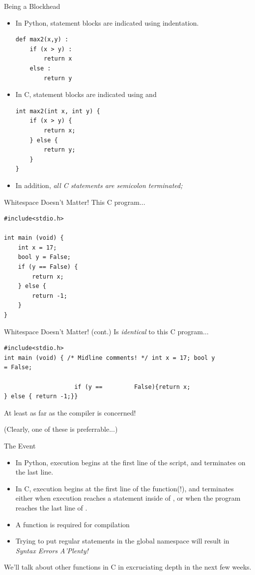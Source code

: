 \documentclass[11pt]{beamer}
\let\OldTexttt\texttt
\renewcommand{\texttt}[1]{\OldTexttt{\color{teal}{#1}}}
\begin{document}
\begin{frame}[fragile=singleslide]{Being a Blockhead}
\begin{itemize}
\item In Python, statement blocks are indicated using indentation.
\begin{lstlisting}[style=Python]
def max2(x,y) :
	if (x > y) :
		return x
	else :
		return y
\end{lstlisting}
\item In C, statement blocks are indicated using \texttt{$\{$} and \texttt{$\}$}
\begin{lstlisting}[style=C]
int max2(int x, int y) {
	if (x > y) {
		return x;
	} else {
		return y;
	}
}
\end{lstlisting}
\item In addition, \emph{all C statements are semicolon terminated;}
\end{itemize}
\end{frame}

\begin{frame}[fragile=singleslide]{Whitespace Doesn't Matter!}
This C program...
\begin{lstlisting}[style=C]
#include<stdio.h>

int main (void) { 
	int x = 17;
	bool y = False;
	if (y == False) {
		return x;
	} else {
		return -1;
	}
}
\end{lstlisting}
\end{frame}
\begin{frame}[fragile=singleslide]{Whitespace Doesn't Matter! (cont.)}
Is \emph{identical} to this C program...
\begin{lstlisting}[style=C]
#include<stdio.h>
int main (void) { /* Midline comments! */ int x = 17; bool y 
= False;
	
					if (y ==         False){return x;
} else { return -1;}}
\end{lstlisting}
At least as far as the compiler is concerned! 

(Clearly, one of these is preferrable...)
\end{frame}

\begin{frame}{The \texttt{main} Event}
\begin{itemize}
\item In Python, execution begins at the first line of the script, and terminates on the last line.  
\item In C, execution begins at the first line of the \texttt{main} function(!), and terminates either when execution reaches a \texttt{return} statement inside of \texttt{main}, or when the program reaches the last line of \texttt{main}.
\item A \texttt{main} function is required for compilation
\item Trying to put regular statements in the global namespace will result in \emph{Syntax Errors A'Plenty!}
\end{itemize}
We'll talk about other functions in C in excruciating depth in the next few weeks.
\end{frame}
\end{document}
